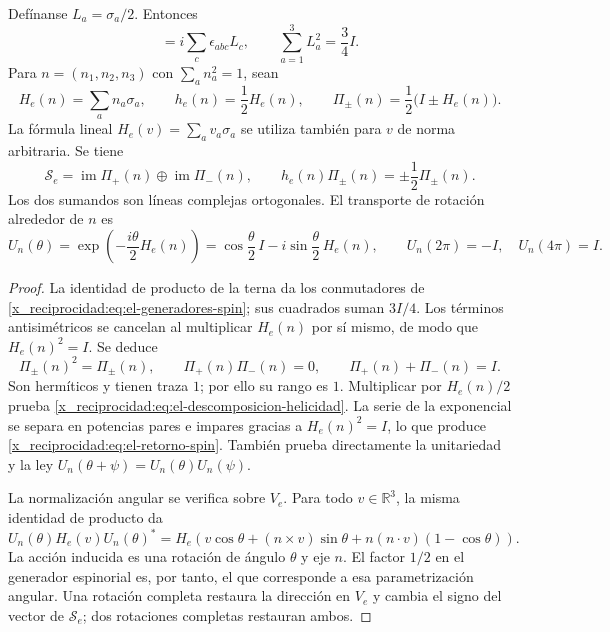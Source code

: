 \begin{proposition}
\label{x_reciprocidad:prop:el-helicidad}
Defínanse \(L_a=\sigma_a/2\). Entonces
\begin{equation}
 [L_a,L_b]=i\sum_c\epsilon_{abc}L_c,
 \qquad \sum_{a=1}^3L_a^2=\frac34 I.
 \label{x_reciprocidad:eq:el-generadores-spin}
\end{equation}
Para \(n=(n_1,n_2,n_3)\) con \(\sum_an_a^2=1\), sean
\[
 H_e(n)=\sum_an_a\sigma_a,\qquad
 h_e(n)=\frac12H_e(n),\qquad
 \Pi_\pm(n)=\frac12\bigl(I\pm H_e(n)\bigr).
\]
La fórmula lineal \(H_e(v)=\sum_av_a\sigma_a\) se utiliza también
para \(v\) de norma arbitraria.
Se tiene
\begin{equation}
 \mathscr S_e=\operatorname{im}\Pi_+(n)
             \mathbin{\oplus}\operatorname{im}\Pi_-(n),
 \qquad
 h_e(n)\Pi_\pm(n)=\pm\frac12\Pi_\pm(n).
 \label{x_reciprocidad:eq:el-descomposicion-helicidad}
\end{equation}
Los dos sumandos son líneas complejas ortogonales. El transporte de
rotación alrededor de \(n\) es
\begin{equation}
 U_n(\theta)=\exp\!\left(-\frac{i\theta}{2}H_e(n)\right)
 =\cos\frac\theta2\,I-i\sin\frac\theta2\,H_e(n),
 \qquad
 U_n(2\pi)=-I,\quad U_n(4\pi)=I.
 \label{x_reciprocidad:eq:el-retorno-spin}
\end{equation}
\end{proposition}
\begin{proof}
La identidad de producto de la terna da los conmutadores de
\eqref{x_reciprocidad:eq:el-generadores-spin}; sus cuadrados suman \(3I/4\).
Los términos antisimétricos se cancelan al multiplicar
\(H_e(n)\) por sí mismo, de modo que \(H_e(n)^2=I\).
Se deduce
\[
 \Pi_\pm(n)^2=\Pi_\pm(n),\qquad
 \Pi_+(n)\Pi_-(n)=0,\qquad \Pi_+(n)+\Pi_-(n)=I.
\]
Son hermíticos y tienen traza \(1\); por ello su rango es \(1\).
Multiplicar por \(H_e(n)/2\) prueba
\eqref{x_reciprocidad:eq:el-descomposicion-helicidad}. La serie de la exponencial se
separa en potencias pares e impares gracias a \(H_e(n)^2=I\), lo que
produce \eqref{x_reciprocidad:eq:el-retorno-spin}. También prueba directamente la
unitariedad y la ley \(U_n(\theta+\psi)=U_n(\theta)U_n(\psi)\).

La normalización angular se verifica sobre \(V_e\). Para todo
\(v\in\mathbb R^3\), la misma identidad de producto da
\[
 U_n(\theta)H_e(v)U_n(\theta)^*
 =H_e\!\left(v\cos\theta+(n\mathbin{\times}v)\sin\theta
       +n(n\mathbin{\cdot}v)(1-\cos\theta)\right).
\]
La acción inducida es una rotación de ángulo \(\theta\) y eje \(n\).
El factor \(1/2\) en el generador espinorial es, por tanto, el que
corresponde a esa parametrización angular. Una rotación completa restaura
la dirección en \(V_e\) y cambia el signo del vector de
\(\mathscr S_e\); dos rotaciones completas restauran ambos.
\end{proof}


